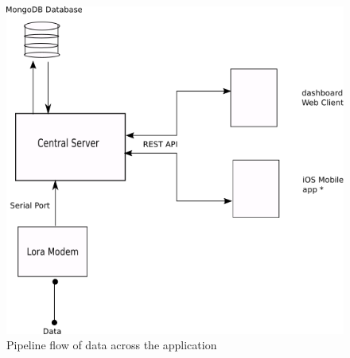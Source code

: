 \begin{figure}
	\centering
	\includegraphics[width=\linewidth]{arch}
	\caption{Pipeline flow of data across the application}
	\label{figure:arch}
\end{figure}

